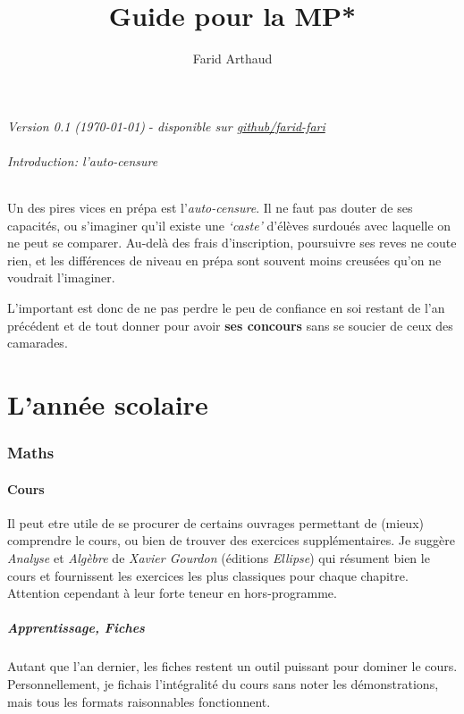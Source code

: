\documentclass{article}
\begin{document}
\title{Guide pour la MP*}
\author{Farid Arthaud}
\maketitle
\tableofcontents

\textit{Version 0.1 (\today)} - \textit{disponible sur \href{https://github.com/farid-fari/guideprepa}{github/farid-fari}}

\paragraph{Introduction: l'auto-censure}\mbox{}\newline
Un des pires vices en prépa est l'\textit{auto-censure}.
Il ne faut pas douter de ses capacités, ou s'imaginer qu'il existe une \textit{`caste'} d'élèves surdoués avec laquelle on ne peut se comparer.
Au-delà des frais d'inscription, poursuivre ses reves ne coute rien, et les différences de niveau en prépa sont souvent moins creusées qu'on ne voudrait l'imaginer.

L'important est donc de ne pas perdre le peu de confiance en soi restant de l'an précédent et de tout donner pour avoir \textbf{ses concours} sans se soucier de ceux des camarades.

\part{L'année scolaire}
\section{Maths}
\subsection{Cours}
Il peut etre utile de se procurer de certains ouvrages permettant de (mieux) comprendre le cours, ou bien de trouver des exercices supplémentaires.
Je suggère \textit{Analyse} et \textit{Algèbre} de \textit{Xavier Gourdon} (éditions \textit{Ellipse}) qui résument bien le cours et fournissent les exercices les plus classiques pour chaque chapitre.
Attention cependant à leur forte teneur en hors-programme.

\subsubsection{Apprentissage, Fiches}
Autant que l'an dernier, les fiches restent un outil puissant pour dominer le cours.
Personnellement, je fichais l'intégralité du cours sans noter les démonstrations, mais tous les formats raisonnables fonctionnent.
\end{document}
